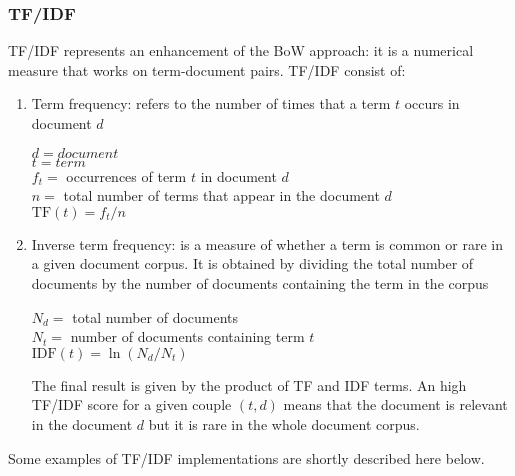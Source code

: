 \documentclass[\main/main.tex]{subfiles}
\begin{document}
\subsubsection{TF/IDF}
TF/IDF represents an enhancement of the BoW approach: it is a numerical measure that works on term-document pairs. TF/IDF consist of:
\begin{enumerate}
    \item Term frequency: refers to the number of times that a term $t$ occurs in document $d$
    \begin{center}
        $d=document$\\
        $t=term$\\
        $f_t=$  occurrences of term $t$ in document $d$\\
        $n =$ total number of terms that appear in the document $d$ \\
        $\mathrm{TF}(t) = f_t / n$
    \end{center}
    \item Inverse term frequency: is a measure of whether a term is common or rare in a given document corpus. It is obtained by dividing the total number of documents by the number of documents containing the term in the corpus \cite{NETTLETON2014171}
    \begin{center}
        $N_d = $ total number of documents\\
        $N_t = $ number of documents containing term $t$\\
        $\mathrm{IDF}(t) = \ln(N_d/N_t)$
    \end{center}
    The final result is given by the product of TF and IDF terms. An high TF/IDF score for a given couple $(t, d)$ means that the document is relevant in the document $d$ but it is rare in the whole document corpus.
\end{enumerate}
Some examples of TF/IDF implementations are shortly described here below.
\end{document}
